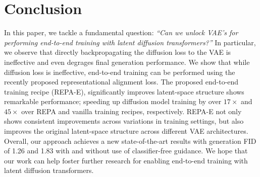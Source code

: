 \documentclass[10pt,twocolumn,letterpaper]{article}
\begin{document}
 \section{Conclusion}
\label{sec:conclusion}
In this paper, we tackle a fundamental question: \emph{``Can we unlock VAE's for performing end-to-end training with latent diffusion transformers?''} In particular, we observe that directly backpropagating the diffusion loss to the VAE is ineffective and even degrages final generation performance. We show that while diffusion loss is ineffective, end-to-end training can be performed using the recently proposed representational alignment loss. The proposed end-to-end training recipe (REPA-E), significantly improves latent-space structure shows remarkable performance; speeding up diffusion model training by over $17\times$ and $45\times$ over REPA and vanilla training recipes, respectively. REPA-E not only shows consistent improvements across variations in training settings, but also improves the original latent-space structure across different VAE architectures.  Overall, our approach achieves a new state-of-the-art results with generation FID of 1.26 and 1.83 with and without use of classifier-free guidance. We hope that our work can help foster further research for enabling end-to-end training with latent diffusion transformers.
 {   
    \small
    
    
}
\end{document}
